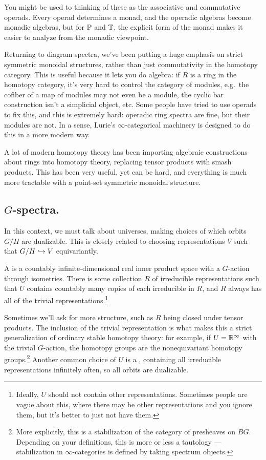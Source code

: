 \begin{rem}
You might be used to thinking of these as the associative and commutative operads. Every operad determines a monad,
and the operadic algebras become monadic algebras, but for $\P$ and $\T$, the explicit form of the monad makes it
easier to analyze from the monadic viewpoint.
\end{rem}
Returning to diagram spectra, we've been putting a huge emphasis on strict symmetric monoidal structures, rather
than just commutativity in the homotopy category. This is useful because it lets you do algebra: if $R$ is a ring
in the homotopy category, it's very hard to control the category of modules, e.g.\ the cofiber of a map of modules
may not even be a module, the cyclic bar construction isn't a simplicial object, etc. Some people have tried to use
operads to fix this, and this is extremely hard: operadic ring spectra are fine, but their modules are not. In a
sense, Lurie's $\infty$-categorical machinery is designed to do this in a more modern way.

A lot of modern homotopy theory has been importing algebraic constructions about rings into homotopy theory,
replacing tensor products with smash products. This has been very useful, yet can be hard, and everything is much
more tractable with a point-set symmetric monoidal structure.
\subsection*{$G$-spectra.}
In this context, we must talk about universes, making choices of which orbits $G/H$ are dualizable. This is closely
related to choosing representations $V$ such that $G/H\inj V$ equivariantly.
\begin{defn}
A  is a countably infinite-dimensional real inner product space with a $G$-action through
isometries. There is some collection $R$ of irreducible representations such that $U$ contains countably many
copies of each irreducible in $R$, and $R$ always has all of the trivial representations.\footnote{Ideally, $U$
should not contain other representations. Sometimes people are vague about this, where there may be other
representations and you ignore them, but it's better to just not have them.}
\end{defn}
Sometimes we'll ask for more structure, such as $R$ being closed under tensor products. The inclusion of the
trivial representation is what makes this a strict generalization of ordinary stable homotopy theory: for example,
if $U = \R^\infty$ with the trivial $G$-action, the homotopy groups are the nonequivariant homotopy
groups.\footnote{More explicitly, this is a stabilization of the category of presheaves on $BG$. Depending on your
definitions, this is more or less a tautology --- stabilization in $\infty$-categories is defined by taking
spectrum objects.} Another common choice of $U$ is a , containing all irreducible
representations infinitely often, so all orbits are dualizable.

